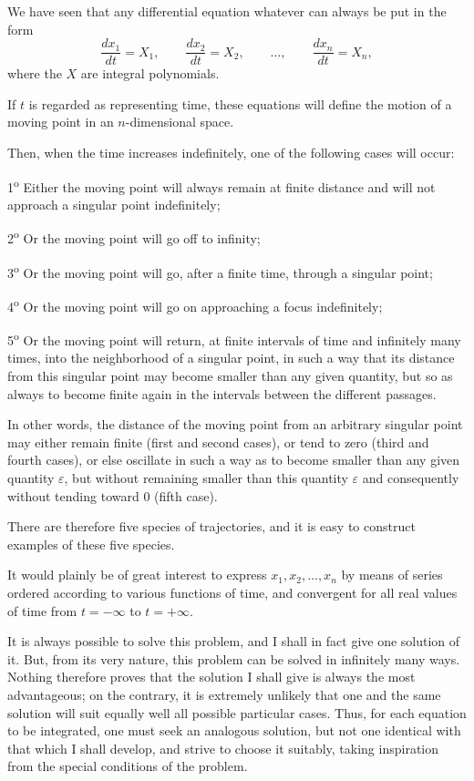 \documentclass[11pt]{article}
\begin{document}
We have seen that any differential equation whatever can always be put in the form
\begin{equation}
\frac{dx_1}{dt}=X_1,\qquad \frac{dx_2}{dt}=X_2,\qquad \ldots,\qquad \frac{dx_n}{dt}=X_n,
\tag{1}
\end{equation}
where the $X$ are integral polynomials.

If $t$ is regarded as representing time, these equations will define the motion of a moving point in an $n$-dimensional space.

Then, when the time increases indefinitely, one of the following cases will occur:

1\textsuperscript{o} Either the moving point will always remain at finite distance and will not approach a singular point indefinitely;

2\textsuperscript{o} Or the moving point will go off to infinity;

3\textsuperscript{o} Or the moving point will go, after a finite time, through a singular point;

4\textsuperscript{o} Or the moving point will go on approaching a focus indefinitely;

5\textsuperscript{o} Or the moving point will return, at finite intervals of time and infinitely many times, into the neighborhood of a singular point, in such a way that its distance from this singular point may become smaller than any given quantity, but so as always to become finite again in the intervals between the different passages.

In other words, the distance of the moving point from an arbitrary singular point may either remain finite (first and second cases), or tend to zero (third and fourth cases), or else oscillate in such a way as to become smaller than any given quantity $\varepsilon$, but without remaining smaller than this quantity $\varepsilon$ and consequently without tending toward 0 (fifth case).

There are therefore five species of trajectories, and it is easy to construct examples of these five species.

It would plainly be of great interest to express $x_1,x_2,\ldots,x_n$ by means of series ordered according to various functions of time, and convergent for all real values of time from $t=-\infty$ to $t=+\infty$.

It is always possible to solve this problem, and I shall in fact give one solution of it. But, from its very nature, this problem can be solved in infinitely many ways. Nothing therefore proves that the solution I shall give is always the most advantageous; on the contrary, it is extremely unlikely that one and the same solution will suit equally well all possible particular cases. Thus, for each equation to be integrated, one must seek an analogous solution, but not one identical with that which I shall develop, and strive to choose it suitably, taking inspiration from the special conditions of the problem.
\end{document}
